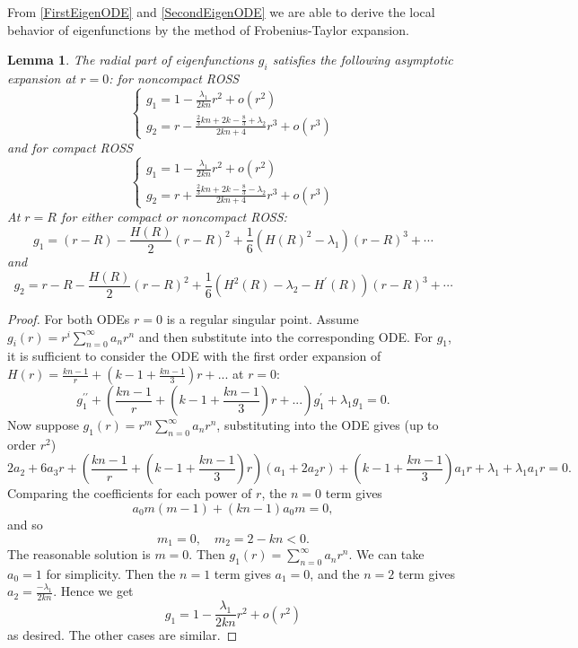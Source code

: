 \documentclass{amsart}
\numberwithin{equation}{section}
\theoremstyle{plain}
\newtheorem{lemma}[theorem]{Lemma}
\theoremstyle{definition}
\theoremstyle{remark}
\begin{document}
From \cref{FirstEigenODE} and \cref{SecondEigenODE} we are able to derive the local behavior of eigenfunctions by the method of Frobenius-Taylor expansion.
\begin{lemma}\label{EigenfunctionExpansion}
    The radial part of eigenfunctions $g_i$ satisfies the following asymptotic expansion at $r=0$: for noncompact ROSS
    \begin{equation}
\left\{\begin{array}{l}
g_1=1-\frac{\lambda_1}{2 k n} r^2+o\left(r^2\right) \\
g_2=r-\frac{\frac{2}{3} k n+2 k-\frac{8}{3}+\lambda_2}{2 k n+4} r^3+o\left(r^3\right)
\end{array}\right.
\end{equation}
and for compact ROSS    
\begin{equation}
\left\{\begin{array}{l}
g_1=1-\frac{\lambda_1}{2 k n} r^2+o\left(r^2\right) \\
g_2=r+\frac{\frac{2}{3} k n+2 k-\frac{8}{3}-\lambda_2}{2 k n+4} r^3+o\left(r^3\right)
\end{array}\right.
\end{equation}
At $r=R$ for either compact or noncompact ROSS:\[g_1=(r-R)-\frac{H(R)}{2}(r-R)^2+\frac{1}{6}\left(H(R)^2-\lambda_1\right)(r-R)^3+\cdots\] and
\[g_2=r-R-\frac{H(R)}{2}(r-R)^2+\frac{1}{6}\left(H^2(R)-\lambda_2-H^{\prime}(R)\right)(r-R)^3+\cdots\]
\end{lemma}

\begin{proof}
    For both ODEs $r=0$ is a regular singular point. Assume $g_i(r)=r^i \sum_{n=0}^{\infty} a_n r^n$ and then substitute into the corresponding ODE. For $g_1$, it is sufficient to consider the ODE with the first order expansion of $H(r)= \frac{kn-1}{r}+(k-1+\frac{kn-1}{3})r+...$ at $r=0$: \[g_1^{\prime \prime}+(\frac{kn-1}{r}+(k-1+\frac{kn-1}{3})r+...)g_1^{\prime}+\lambda_1 g_1=0.\]
    Now suppose $g_1(r)=r^m \sum_{n=0}^{\infty} a_n r^n$, substituting into the ODE gives (up to order $r^2$)
    \[2a_2+6a_3r+(\frac{kn-1}{r}+(k-1+\frac{kn-1}{3})r)(a_1+2a_2r)+(k-1+\frac{kn-1}{3})a_1r+\lambda_1+\lambda_1 a_1r=0.\]
    Comparing the coefficients for each power of $r$, the $n=0$ term gives \[a_0 m(m-1)+(k n-1) a_0 m=0,\] and so \[m_1=0, \quad m_2=2-k n<0.\] The reasonable solution is $m=0$. Then $g_1(r)=\sum_{n=0}^{\infty} a_n r^n$. We can take $a_0=1$ for simplicity. Then the $n=1$ term gives $a_1=0$, and the $n=2$ term gives $a_2=\frac{-\lambda_1}{2 k n}$. Hence we get \[g_1=1-\frac{\lambda_1}{2 k n} r^2+o\left(r^2\right)\] as desired. The other cases are similar.
\end{proof}
\end{document}
